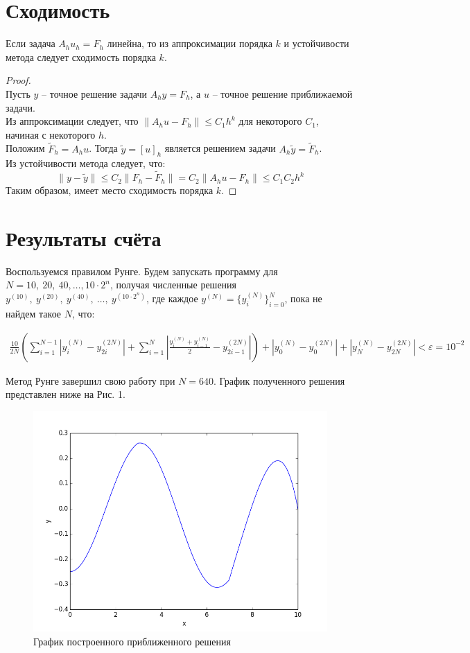 \documentclass[titlepage]{article}
\def\l{\left}
\def\r{\right}
\def\le{\leqslant}
\begin{document}
\section{Сходимость}
\begin{theorem}
	Если задача $A_h u_h = F_h$ линейна, то из аппроксимации порядка $k$ и устойчивости метода следует сходимость порядка $k$.
\end{theorem}
\begin{proof}
\hfill \\
Пусть $y$ -- точное решение задачи $A_hy = F_h$, а $u$ -- точное решение приближаемой задачи. \\
Из аппроксимации следует, что $\|A_hu - F_h\| \le C_1h^k$ для некоторого $C_1$, начиная с некоторого $h$. \\
Положим $\tilde F_h = A_h u$. Тогда $\tilde y = [u]_h$ является решением задачи $A_h \tilde y = \tilde F_h$. \\
Из устойчивости метода следует, что:
$$\| y - \tilde y \| \le C_2 \| F_h - \tilde F_h \| = C_2 \| A_h u - F_h \| \le C_1 C_2 h^k$$ 
Таким образом, имеет место сходимость порядка $k$.
\end{proof}

\section{Результаты счёта}
Воспользуемся правилом Рунге. Будем запускать программу для $N = 10,\ 20,\ 40,\dots,10\cdot2^n$, получая численные решения $y^{(10)},\ y^{(20)},\  y^{(40)},\ \dots ,\  y^{(10\cdot2^n)}$, где каждое $y^{(N)} = \{y_i^{(N)}\}_{i=0}^{N}$, пока не найдем такое $N$, что:

\begin{gather*}
	\frac{10}{2N} \l( \sum_{i=1}^{N-1}{\l| y_i^{(N)} - y_{2i}^{(2N)} \r|} + \sum_{i=1}^{N}{ \l| \frac{y_i^{(N)} + y_{i-1}^{(N)}}{2}  - y_{2i-1}^{(2N)} \r|} \r) + \l|y_0^{(N)} - y_{0}^{(2N)}\r| + \l|y_N^{(N)} - y_{2N}^{(2N)}\r| < \varepsilon = 10^{-2}
\end{gather*}

Метод Рунге завершил свою работу при $N = 640$. График полученного решения представлен ниже на Рис. 1.

\begin{figure}[h]
	\includegraphics[width=150mm]{figure_1.png}		
	\caption{График построенного приближенного решения}
\end{figure}
	
\end{document}
